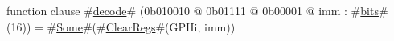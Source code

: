 function clause #\hyperref[sailMIPSzdecode]{decode}# (0b010010 @ 0b01111 @ 0b00001 @ imm : #\hyperref[sailMIPSzbits]{bits}#(16)) = #\hyperref[sailMIPSzSome]{Some}#(#\hyperref[sailMIPSzClearRegs]{ClearRegs}#(GPHi, imm))
